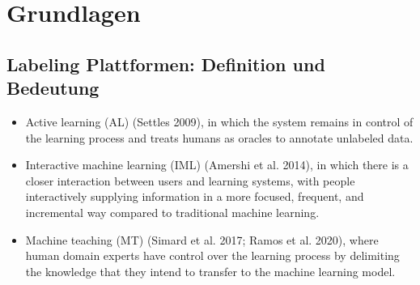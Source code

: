 \chapter{Grundlagen}\label{sec:basics}
\section{Labeling Plattformen: Definition und Bedeutung}\label{sec:basics-labeling-plattformen-definition}

\begin{itemize}
    \item Active learning (AL) (Settles 2009), in which the system remains in control of the
learning process and treats humans as oracles to annotate unlabeled data.
    \item Interactive machine learning (IML) (Amershi et al. 2014), in which there is a closer
interaction between users and learning systems, with people interactively supplying
information in a more focused, frequent, and incremental way compared to traditional
machine learning.
    \item Machine teaching (MT) (Simard et al. 2017; Ramos et al. 2020), where human domain
experts have control over the learning process by delimiting the knowledge that they
intend to transfer to the machine learning model.
\end{itemize}
